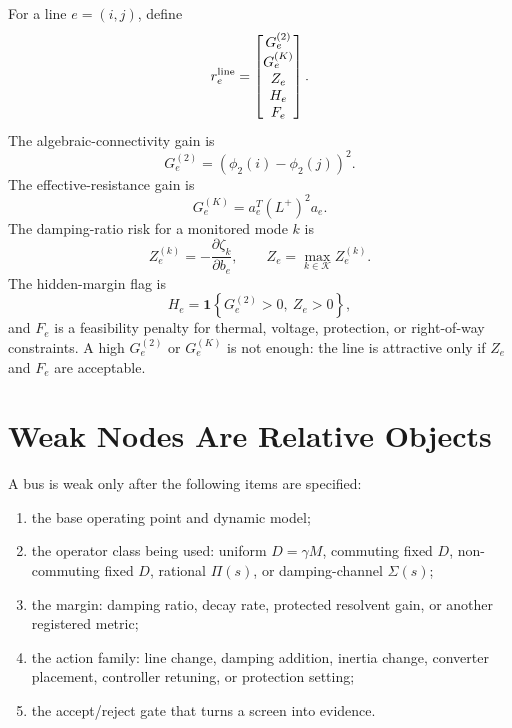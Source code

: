 For a line \(e=(i,j)\), define
\begin{equation}
  r_e^{\rm line}=
  \begin{bmatrix}
  G_e^{(2)}\\
  G_e^{(K)}\\
  Z_e\\
  H_e\\
  F_e
  \end{bmatrix}.
  \label{eq:line_risk_vector}
\end{equation}
The algebraic-connectivity gain is
\begin{equation}
  G_e^{(2)}=(\phi_2(i)-\phi_2(j))^2.
  \label{eq:line_fiedler_gain}
\end{equation}
The effective-resistance gain is
\begin{equation}
  G_e^{(K)}
  =
  a_e^T(L^+)^2a_e.
  \label{eq:line_kirchhoff_gain}
\end{equation}
The damping-ratio risk for a monitored mode \(k\) is
\begin{equation}
  Z_e^{(k)}
  =
  -\frac{\partial\zeta_k}{\partial b_e},
  \qquad
  Z_e=\max_{k\in\mathcal K} Z_e^{(k)}.
  \label{eq:line_zeta_risk}
\end{equation}
The hidden-margin flag is
\begin{equation}
  H_e=\mathbf 1\left\{
  G_e^{(2)}>0,\ Z_e>0
  \right\},
  \label{eq:line_hidden_flag}
\end{equation}
and \(F_e\) is a feasibility penalty for thermal, voltage, protection, or
right-of-way constraints. A high \(G_e^{(2)}\) or \(G_e^{(K)}\) is not enough:
the line is attractive only if \(Z_e\) and \(F_e\) are acceptable.

\section{Weak Nodes Are Relative Objects}

A bus is weak only after the following items are specified:
\begin{enumerate}
\item the base operating point and dynamic model;
\item the operator class being used: uniform \(D=\gamma M\), commuting fixed
\(D\), non-commuting fixed \(D\), rational \(\Pi(s)\), or damping-channel
\(\Sigma(s)\);
\item the margin: damping ratio, decay rate, protected resolvent gain, or
another registered metric;
\item the action family: line change, damping addition, inertia change,
converter placement, controller retuning, or protection setting;
\item the accept/reject gate that turns a screen into evidence.
\end{enumerate}

